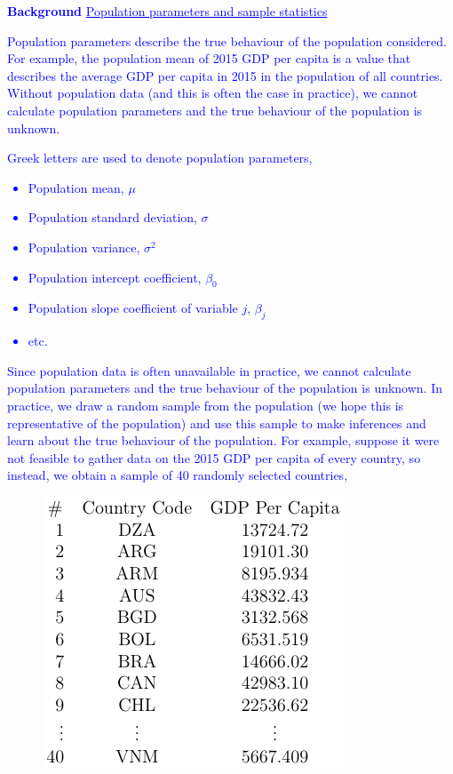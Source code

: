 \documentclass[12pt]{report}
\newenvironment{blueframed}[1][blue]
{\def\FrameCommand{\fboxsep=\FrameSep\fcolorbox{#1}{white}}%
\MakeFramed {\advance\hsize-\width \FrameRestore}}
{\endMakeFramed}
\begin{document}
\justify
\begin{blueframed}
	\textcolor{blue}{\textbf{Background}}
	\vspace{-\baselineskip}
	\justify
	\textcolor{blue}{\underline{Population parameters and sample statistics}}
	
	\noindent \textcolor{blue}
	{
		Population parameters describe the true behaviour of the population considered. For example, the population mean of 2015 GDP per capita is a value that describes the average GDP per capita in 2015 in the population of all countries. Without population data (and this is often the case in practice), we cannot calculate population parameters and the true behaviour of the population is unknown.}
\end{blueframed} 
\begin{blueframed} \textcolor{blue}{\vspace{-\baselineskip} \noindent Greek letters are used to denote population parameters, \begin{itemize}
			\item Population mean, $\mu$
			\item Population standard deviation, $\sigma$
			\item Population variance, $\sigma^2$
			\item Population intercept coefficient, $\beta_0$
			\item Population slope coefficient of variable $j$, $\beta_j$
			\item etc.
		\end{itemize} Since population data is often unavailable in practice, we cannot calculate population parameters and the true behaviour of the population is unknown. In practice, we draw a random sample from the population (we hope this is representative of the population) and use this sample to make inferences and learn about the true behaviour of the population. For example, suppose it were not feasible to gather data on the 2015 GDP per capita of every country, so instead, we obtain a sample of 40 randomly selected countries, \begin{figure}[H]
		\centerline{\includegraphics{2018sem2_q1_14}}

\end{figure}}
\end{blueframed}
\end{document}
